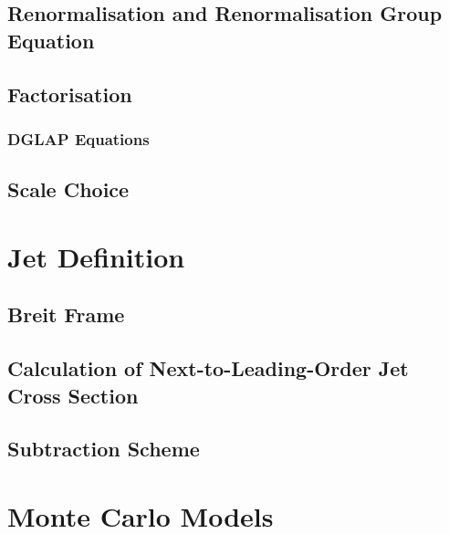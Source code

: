 \subsection{Renormalisation and Renormalisation Group Equation}


\subsection{Factorisation}
\label{subsec:factorisation}


\subsubsection{DGLAP Equations}
\label{subsubsec:dglapeq}


\subsection{Scale Choice}


\section{Jet Definition}
\label{sec:jetalgo}


\subsection{Breit Frame}
\label{subsec:breitframe}


\subsection{Calculation of Next-to-Leading-Order Jet Cross Section}
\label{subsec:nlojetcalc}


\subsection{Subtraction Scheme}
\label{subsec:subscheme}


%

\section{Monte Carlo Models}
\label{sec:mcmodels}
